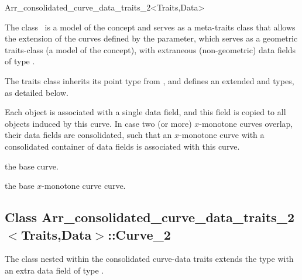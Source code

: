 
\ccRefPageBegin
\begin{ccRefClass}{Arr_consolidated_curve_data_traits_2<Traits,Data>}

\ccDefinition

The class \ccRefName\ is a model of the  concept
and serves as a meta-traits class that allows the extension of the curves
defined by the  parameter, which serves as a geometric
traits-class (a model of the  concept), with
extraneous (non-geometric) data fields of type .

The traits class inherits its point type from ,
and defines an extended  and  types,
as detailed below.

Each  object is associated with a single data field, and this 
field is copied to all  objects induced by this curve.
In case two (or more) $x$-monotone curves overlap, their data fields are
consolidated, such that an $x$-monotone curve with a consolidated container
of data fields is associated with this curve.

 
\ccIsModel

\ccInheritsFrom

\ccTypes

    {the base curve.}

    {the base $x$-monotone curve curve.}

\subsection*{Class 
 Arr\_consolidated\_curve\_data\_traits\_2$<$Traits,Data$>$::Curve\_2}

The  class nested within the consolidated curve-data traits
extends the  type with an extra data field of type
.


\end{ccRefClass}
